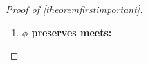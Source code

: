 \begin{proof}[Proof of \ref{theoremfirstimportant}]
%
%
%
\begin{enumerate}
\item{\bf$\phi$ preserves meets:}


\end{enumerate}
\end{proof}
